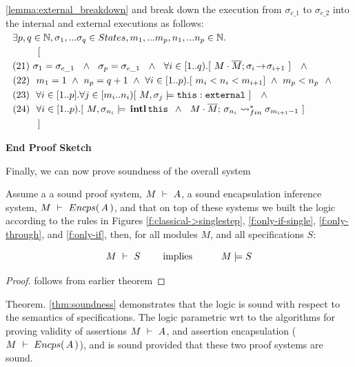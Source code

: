\begin{description}
\ref{lemma:external_breakdown} and break down the execution from $\sigma_{e\_1}$ to  $\sigma_{e\_2}$ into the internal and external executions as follows:
\\
$\strut \ \ \exists p,q\in \mathbb{N},  \sigma_1, ... \sigma_q \in States, m_1,...m_p, n_1, ... n_p \in \mathbb{N}.$\\  
$\strut \ \ \ \ \ \ \ \ \ \ [  $ \\
$\strut \ \ (21) \ \sigma_1=\sigma_{e\_1} \ \ \wedge\ \  \sigma_p=\sigma_{e\_1}\ \  \wedge\ \ \forall i\in [1..q).[\   \leadstoOrig {M\cdot \Mtwo}  {\sigma_i}  {\sigma_{i+1}}\  ] \  \ \ \wedge$\\
$\strut \ \ (22) \ \ m_1=1 \ \wedge\ n_p=q+1 \  \wedge\ \forall i\in[1..p).[  \  m_i < n_i < m_{i+1}  ] \ \wedge \ m_p<n_p\ \ \wedge  $\\
$\strut \ \ (23) \ \ \forall i\in[1..p].\forall j\in [m_i..n_i)[\   M,\sigma_j \models \texttt{this}:\mbox{\normalfont{\texttt{external}}} \ ] \  \ \ \wedge$\\
$\strut \ \ (24) \ \ \forall i\in[1..p). [ \ M,\sigma_{n_i} \models \internal {\texttt{this}}   \ \wedge \ \ 
 \leadstoBoundedStarFin {M\cdot \Mtwo}  {\sigma_{n_{i}}}  {\sigma_{m_{i+1}-1}} \ ] $ \\
$\strut \ \ \ \ \ \ \ \ \ \ ]$
 

\end{description}
\noindent
\vspace{.1cm}
  {\textbf{End Proof Sketch}} 

\vspace{1cm}

Finally, we can now prove soundness of the overall system

\begin{theorem}[Soundness]
\label{thm:soundness}
Assume a a sound \SpecO proof system, $M\ \vdash\ A$, 
a sound encapsulation inference system, $M\ \vdash\ {Encps(\, A\, )}$,
 and  that on top of these systems we built
 the \SpecLang logic according to the rules in Figures \ref{f:classical->singlestep},  \ref{f:only-if-single}, 
 \ref{f:only-through},  and \ref{f:only-if},   then, for    all modules $M$, and all \SpecLang specifications  $S$:
 
 $$\proves{M}{S}\ \ \ \ \ \ \ \mbox{implies}\ \ \ \ \ \  \ \ \ \satisfies{M}{S}$$
\end{theorem}

\begin{proof}
follows from earlier theorem
\end{proof}
 


Theorem. \ref{thm:soundness} demonstrates 
 that the   \SpecLang logic is sound with respect to the semantics of \SpecLang specifications.
 The \SpecLang logic parametric wrt to the algorithms for proving validity of assertions
 $M\ \vdash\ A$, and 
 assertion encapsulation ($M\ \vdash\ {Encps(\, A\, )}$), and is sound
 provided that these two proof systems are sound.

